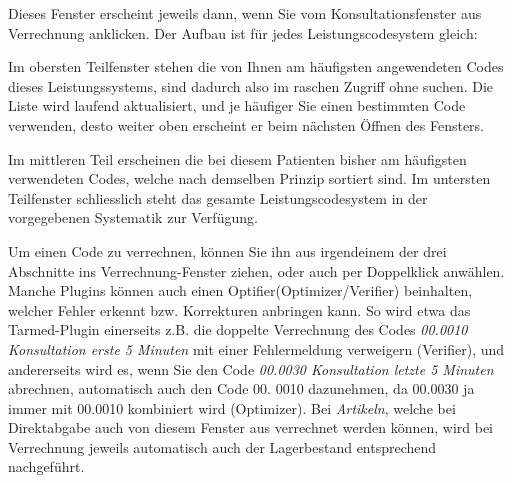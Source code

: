 Dieses Fenster erscheint jeweils dann, wenn Sie vom Konsultationsfenster aus \glqq{}Verrechnung\grqq{} anklicken. Der Aufbau ist für jedes Leistungscodesystem gleich:

Im obersten Teilfenster stehen die von Ihnen am häufigsten angewendeten Codes dieses Leistungssystems, sind dadurch also im raschen Zugriff ohne suchen. Die Liste wird laufend aktualisiert, und je häufiger Sie einen bestimmten Code verwenden, desto weiter oben erscheint er beim nächsten Öffnen des Fensters.

\medskip
Im mittleren Teil erscheinen die bei diesem Patienten bisher am häufigsten verwendeten Codes, welche nach demselben Prinzip sortiert sind. Im untersten Teilfenster schliesslich steht das gesamte Leistungscodesystem in der vorgegebenen Systematik zur Verfügung.

\bigskip

Um einen Code zu verrechnen, können Sie ihn  aus irgendeinem der drei Abschnitte ins Verrechnung-Fenster ziehen, oder auch per Doppelklick anwählen. Manche Plugins können auch einen \glqq Optifier\grqq (Optimizer/Verifier) beinhalten, welcher Fehler erkennt bzw. Korrekturen anbringen kann. So wird etwa das Tarmed-Plugin einerseits z.B. die doppelte Verrechnung des Codes \textit{00.0010 Konsultation erste 5 Minuten} mit einer Fehlermeldung verweigern (Verifier), und andererseits wird es, wenn Sie den Code \textit{00.0030 Konsultation letzte 5 Minuten} abrechnen, automatisch auch den Code 00. 0010 dazunehmen, da 00.0030 ja immer mit 00.0010 kombiniert wird (Optimizer).
Bei \textit{Artikeln}, welche bei Direktabgabe auch von diesem Fenster aus verrechnet werden können, wird bei Verrechnung jeweils automatisch auch der Lagerbestand entsprechend nachgeführt.

